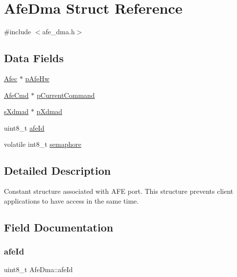 \hypertarget{structAfeDma}{}\section{Afe\+Dma Struct Reference}
\label{structAfeDma}


{\ttfamily \#include $<$afe\+\_\+dma.\+h$>$}

\subsection*{Data Fields}
\begin{DoxyCompactItemize}
\item 
\mbox{\hyperlink{structAfec}{Afec}} $\ast$ \mbox{\hyperlink{structAfeDma_a2caf18e72f15ee510412c7ffbc52c070}{p\+Afe\+Hw}}
\item 
\mbox{\hyperlink{structAfeCmd}{Afe\+Cmd}} $\ast$ \mbox{\hyperlink{structAfeDma_a48faf82abbde9b3ba4520911de816ec4}{p\+Current\+Command}}
\item 
\mbox{\hyperlink{group__dmad__structs_gaf2c13151514615a6beb35c0d868a5053}{s\+Xdmad}} $\ast$ \mbox{\hyperlink{structAfeDma_a5b8d94d12d12890b15e2515fb41213ae}{p\+Xdmad}}
\item 
uint8\+\_\+t \mbox{\hyperlink{structAfeDma_a73da9c1d7f54106c02277b22422b24bf}{afe\+Id}}
\item 
volatile int8\+\_\+t \mbox{\hyperlink{structAfeDma_ab3a539365c98c6c0a4095943f0504295}{semaphore}}
\end{DoxyCompactItemize}


\subsection{Detailed Description}
Constant structure associated with A\+FE port. This structure prevents client applications to have access in the same time. 

\subsection{Field Documentation}
\mbox{\label{structAfeDma_a73da9c1d7f54106c02277b22422b24bf}} 
\subsubsection{\texorpdfstring{afeId}{afeId}}
{\footnotesize\ttfamily uint8\+\_\+t Afe\+Dma\+::afe\+Id}

